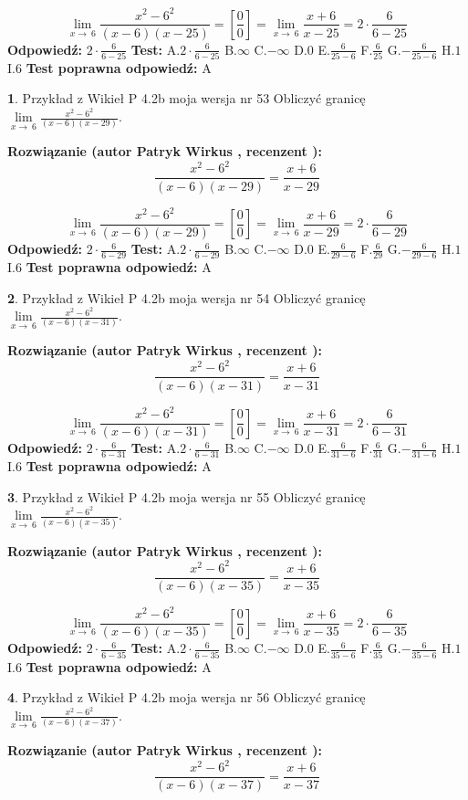 \documentclass[12pt, a4paper]{article}
\theoremstyle{definition} %
\newtheorem{zad}{}
\newcommand{\zadStart}[1]{\begin{zad}#1\newline}
\newcommand{\zadStop}{\end{zad}}
\newcommand{\rozwStart}[2]{\noindent \textbf{Rozwiązanie (autor #1 , recenzent #2): }\newline}
\newcommand{\rozwStop}{\newline}
\newcommand{\odpStart}{\noindent \textbf{Odpowiedź:}\newline}
\newcommand{\odpStop}{\newline}
\newcommand{\testStart}{\noindent \textbf{Test:}\newline}
\newcommand{\testStop}{\newline}
\newcommand{\kluczStart}{\noindent \textbf{Test poprawna odpowiedź:}\newline}
\newcommand{\kluczStop}{\newline}
\begin{document}
$$\lim\limits_{x\to\ 6}\frac{x^{2}-6^{2}}{(x-6)(x-25)}=[\frac{0}{0}]=\lim\limits_{x\to\ 6}\frac{x+6}{x-25}=2 \cdot \frac{6}{6-25}$$
\rozwStop
\odpStart
$2 \cdot \frac{6}{6-25}$
\odpStop
\testStart
A.$2 \cdot \frac{6}{6-25}$
B.$\infty$
C.$-\infty$
D.$0$
E.$\frac{6}{25-6}$
F.$\frac{6}{25}$
G.$-\frac{6}{25-6}$
H.$1$
I.$6$
\testStop
\kluczStart
A
\kluczStop



\zadStart{Przykład z Wikieł P 4.2b moja wersja nr 53}
Obliczyć granicę $\lim\limits_{x\to\ 6}\frac{x^{2}-6^{2}}{(x-6)(x-29)}$.
\zadStop
\rozwStart{Patryk Wirkus}{}
$$\frac{x^{2}-6^{2}}{(x-6)(x-29)}=\frac{x+6}{x-29}$$

$$\lim\limits_{x\to\ 6}\frac{x^{2}-6^{2}}{(x-6)(x-29)}=[\frac{0}{0}]=\lim\limits_{x\to\ 6}\frac{x+6}{x-29}=2 \cdot \frac{6}{6-29}$$
\rozwStop
\odpStart
$2 \cdot \frac{6}{6-29}$
\odpStop
\testStart
A.$2 \cdot \frac{6}{6-29}$
B.$\infty$
C.$-\infty$
D.$0$
E.$\frac{6}{29-6}$
F.$\frac{6}{29}$
G.$-\frac{6}{29-6}$
H.$1$
I.$6$
\testStop
\kluczStart
A
\kluczStop



\zadStart{Przykład z Wikieł P 4.2b moja wersja nr 54}
Obliczyć granicę $\lim\limits_{x\to\ 6}\frac{x^{2}-6^{2}}{(x-6)(x-31)}$.
\zadStop
\rozwStart{Patryk Wirkus}{}
$$\frac{x^{2}-6^{2}}{(x-6)(x-31)}=\frac{x+6}{x-31}$$

$$\lim\limits_{x\to\ 6}\frac{x^{2}-6^{2}}{(x-6)(x-31)}=[\frac{0}{0}]=\lim\limits_{x\to\ 6}\frac{x+6}{x-31}=2 \cdot \frac{6}{6-31}$$
\rozwStop
\odpStart
$2 \cdot \frac{6}{6-31}$
\odpStop
\testStart
A.$2 \cdot \frac{6}{6-31}$
B.$\infty$
C.$-\infty$
D.$0$
E.$\frac{6}{31-6}$
F.$\frac{6}{31}$
G.$-\frac{6}{31-6}$
H.$1$
I.$6$
\testStop
\kluczStart
A
\kluczStop



\zadStart{Przykład z Wikieł P 4.2b moja wersja nr 55}
Obliczyć granicę $\lim\limits_{x\to\ 6}\frac{x^{2}-6^{2}}{(x-6)(x-35)}$.
\zadStop
\rozwStart{Patryk Wirkus}{}
$$\frac{x^{2}-6^{2}}{(x-6)(x-35)}=\frac{x+6}{x-35}$$

$$\lim\limits_{x\to\ 6}\frac{x^{2}-6^{2}}{(x-6)(x-35)}=[\frac{0}{0}]=\lim\limits_{x\to\ 6}\frac{x+6}{x-35}=2 \cdot \frac{6}{6-35}$$
\rozwStop
\odpStart
$2 \cdot \frac{6}{6-35}$
\odpStop
\testStart
A.$2 \cdot \frac{6}{6-35}$
B.$\infty$
C.$-\infty$
D.$0$
E.$\frac{6}{35-6}$
F.$\frac{6}{35}$
G.$-\frac{6}{35-6}$
H.$1$
I.$6$
\testStop
\kluczStart
A
\kluczStop



\zadStart{Przykład z Wikieł P 4.2b moja wersja nr 56}
Obliczyć granicę $\lim\limits_{x\to\ 6}\frac{x^{2}-6^{2}}{(x-6)(x-37)}$.
\zadStop
\rozwStart{Patryk Wirkus}{}
$$\frac{x^{2}-6^{2}}{(x-6)(x-37)}=\frac{x+6}{x-37}$$
\end{document}
